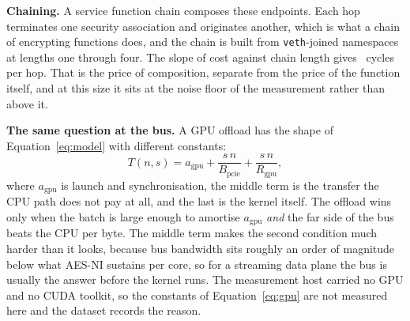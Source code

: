 \noindent\textbf{Chaining.}
A service function chain composes these endpoints. Each hop terminates one
security association and originates another, which is what a chain of encrypting
functions does, and the chain is built from \texttt{veth}-joined namespaces at
lengths one through four. The slope of cost against chain length gives
\virtChainPerHop\ cycles per hop. That is the price of composition, separate
from the price of the function itself, and at this size it sits at the noise
floor of the measurement rather than above it.

\noindent\textbf{The same question at the bus.}
A GPU offload has the shape of Equation~\ref{eq:model} with different constants:
%
\begin{equation}
T(n, s) = a_{\text{gpu}} + \frac{s\,n}{B_{\text{pcie}}}
        + \frac{s\,n}{R_{\text{gpu}}},
\label{eq:gpu}
\end{equation}
%
where $a_{\text{gpu}}$ is launch and synchronisation, the middle term is the
transfer the CPU path does not pay at all, and the last is the kernel itself.
The offload wins only when the batch is large enough to amortise
$a_{\text{gpu}}$ \emph{and} the far side of the bus beats the CPU per byte. The
middle term makes the second condition much harder than it looks, because bus
bandwidth sits roughly an order of magnitude below what AES-NI sustains per
core, so for a streaming data plane the bus is usually the answer before the
kernel runs. The measurement host carried no GPU and no CUDA toolkit, so the
constants of Equation~\ref{eq:gpu} are not measured here and the dataset records
the reason.
